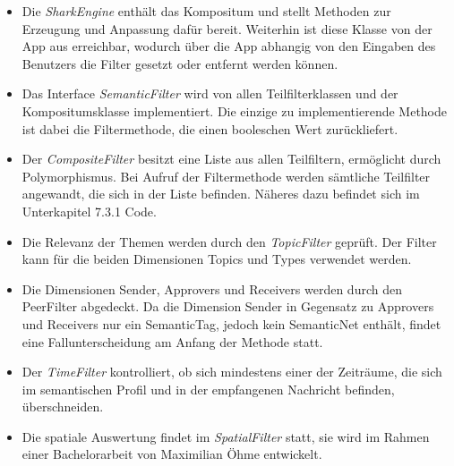 \begin{itemize}
	\item Die \textit{SharkEngine} enthält das Kompositum und stellt Methoden zur Erzeugung und Anpassung dafür bereit. Weiterhin ist diese Klasse von der App aus erreichbar, wodurch über die App abhangig von den Eingaben des Benutzers die Filter gesetzt oder entfernt werden können.
	\item Das Interface \textit{SemanticFilter} wird von allen Teilfilterklassen und der Kompositumsklasse implementiert. Die einzige zu implementierende Methode ist dabei die Filtermethode, die einen booleschen Wert zurückliefert.
	\item Der \textit{CompositeFilter} besitzt eine Liste aus allen Teilfiltern, ermöglicht durch Polymorphismus. Bei Aufruf der Filtermethode werden sämtliche Teilfilter angewandt, die sich in der Liste befinden. Näheres dazu befindet sich im Unterkapitel 7.3.1 Code. 
	\item Die Relevanz der Themen werden durch den \textit{TopicFilter} geprüft. Der Filter kann für die beiden Dimensionen Topics und Types verwendet werden.
	\item Die Dimensionen Sender, Approvers und Receivers werden durch den PeerFilter abgedeckt. Da die Dimension Sender in Gegensatz zu Approvers und Receivers nur ein SemanticTag, jedoch kein SemanticNet enthält, findet eine Fallunterscheidung am Anfang der Methode statt.
	\item Der \textit{TimeFilter} kontrolliert, ob sich mindestens einer der Zeiträume, die sich im semantischen Profil und in der empfangenen Nachricht befinden, überschneiden. 
	\item Die spatiale Auswertung findet im \textit{SpatialFilter} statt, sie wird im Rahmen einer Bachelorarbeit von Maximilian Öhme entwickelt.
\end{itemize}

